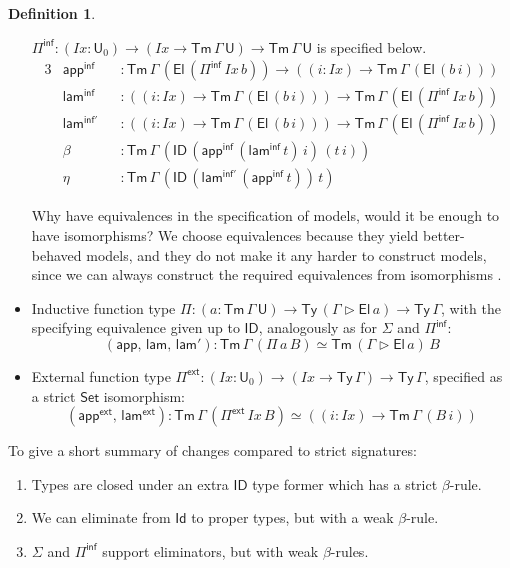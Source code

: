 \documentclass[12pt,a4paper,twoside,openany]{book}
\theoremstyle{remark}
\theoremstyle{definition}
\newtheorem{mydefinition}{Definition}
\theoremstyle{theorem}
\newcommand{\mi}[1]{\mathit{#1}}
\newcommand{\ms}[1]{\mathsf{#1}}
\newcommand{\Tm}{\mathsf{Tm}}
\newcommand{\Ty}{\mathsf{Ty}}
\newcommand{\U}{\mathsf{U}}
\newcommand{\El}{\mathsf{El}}
\newcommand{\Id}{\mathsf{Id}}
\newcommand{\ID}{\mathsf{ID}}
\newcommand{\Set}{\mathsf{Set}}
\newcommand{\ext}{\triangleright}
\newcommand{\Pie}{\Pi^{\mathsf{ext}}}
\newcommand{\appe}{\mathsf{app^{ext}}}
\newcommand{\lame}{\mathsf{lam^{ext}}}
\newcommand{\Piinf}{\Pi^{\mathsf{inf}}}
\newcommand{\appinf}{\mathsf{app^{inf}}}
\newcommand{\laminf}{\mathsf{lam^{inf}}}
\newcommand{\app}{\ms{app}}
\newcommand{\lam}{\ms{lam}}
\begin{document}
\begin{mydefinition}
\begin{itemize}
  $\Piinf : (\mi{Ix} : \U_0) \to (\mi{Ix} \to \Tm\,\Gamma\,\U) \to
  \Tm\,\Gamma\,\U$ is specified below.
  \begin{alignat*}{3}
    &\appinf &&: \Tm\,\Gamma\,(\El\,(\Piinf\,\mi{Ix}\,b)) \to ((i : \mi{Ix}) \to \Tm\,\Gamma\,(\El\,(b\,i)))\\
    &\laminf &&: ((i : \mi{Ix}) \to \Tm\,\Gamma\,(\El\,(b\,i))) \to \Tm\,\Gamma\,(\El\,(\Piinf\,\mi{Ix}\,b))\\
    &\ms{lam^{inf'}} &&: ((i : \mi{Ix}) \to \Tm\,\Gamma\,(\El\,(b\,i))) \to \Tm\,\Gamma\,(\El\,(\Piinf\,\mi{Ix}\,b))\\
    &\ms{\beta} &&: \Tm\,\Gamma\,(\ID\,(\appinf\,(\laminf\,t)\,i)\,(t\,i))\\
    &\ms{\eta}  &&: \Tm\,\Gamma\,(\ID\,(\ms{lam^{inf'}}\,(\appinf\,t))\,t)
  \end{alignat*}

  Why have equivalences in the specification of models, would it be enough to
  have isomorphisms? We choose equivalences because they yield better-behaved
  models, and they do not make it any harder to construct models, since we can
  always construct the required equivalences from isomorphisms
  \cite[Chapter~4]{hottbook}.

  \item
  Inductive function type $\Pi : (a : \Tm\,\Gamma\,\U) \to \Ty\,(\Gamma\ext
  \El\,a) \to \Ty\,\Gamma$, with the specifying equivalence given up to $\ID$,
  analogously as for $\Sigma$ and $\Piinf$:
  \[
    (\app,\,\lam,\,\lam') : \Tm\,\Gamma\,(\Pi\,a\,B) \simeq \Tm\,(\Gamma\ext \El\,a)\,B
  \]

  \item External function type $\Pie : (\mi{Ix} : \U_0) \to (\mi{Ix} \to
  \Ty\,\Gamma) \to \Ty\,\Gamma$, specified as a strict $\Set$ isomorphism:
  \[(\appe,\,\lame) : \Tm\,\Gamma\,(\Pie\,\mi{Ix}\,B) \simeq ((i : \mi{Ix}) \to \Tm\,\Gamma\,(B\,i))\]
\end{itemize}
\end{mydefinition}

\noindent To give a short summary of changes compared to strict signatures:
\begin{enumerate}
  \item Types are closed under an extra $\ID$ type former which has a strict $\beta$-rule.
  \item We can eliminate from $\Id$ to proper types, but with a weak $\beta$-rule.
  \item $\Sigma$ and $\Piinf$ support eliminators, but with weak $\beta$-rules.
\end{enumerate}
\end{document}

